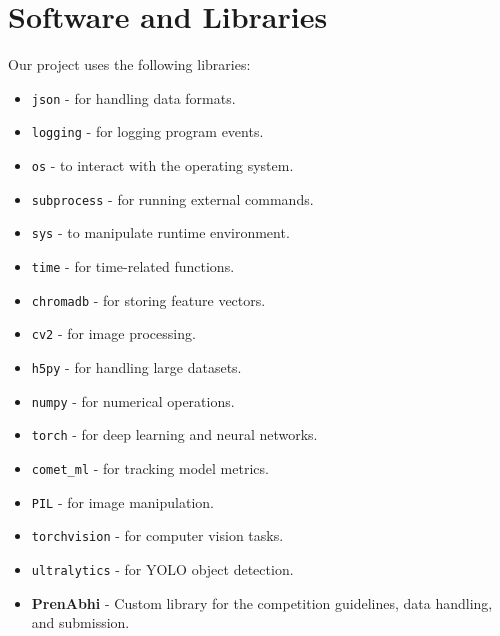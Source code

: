 \documentclass[11pt]{IEEEtran}
\begin{document}
\section{Software and Libraries}
Our project uses the following libraries:
\begin{itemize}
    \item \texttt{json} - for handling data formats.
    \item \texttt{logging} - for logging program events.
    \item \texttt{os} - to interact with the operating system.
    \item \texttt{subprocess} - for running external commands.
    \item \texttt{sys} - to manipulate runtime environment.
    \item \texttt{time} - for time-related functions.
    \item \texttt{chromadb} - for storing feature vectors.
    \item \texttt{cv2} - for image processing.
    \item \texttt{h5py} - for handling large datasets.
    \item \texttt{numpy} - for numerical operations.
    \item \texttt{torch} - for deep learning and neural networks.
    \item \texttt{comet\_ml} - for tracking model metrics.
    \item \texttt{PIL} - for image manipulation.
    \item \texttt{torchvision} - for computer vision tasks.
    \item \texttt{ultralytics} - for YOLO object detection.
    \item \textbf{PrenAbhi} - Custom library for the competition guidelines,
          data handling, and submission.
\end{itemize}
\end{document}
